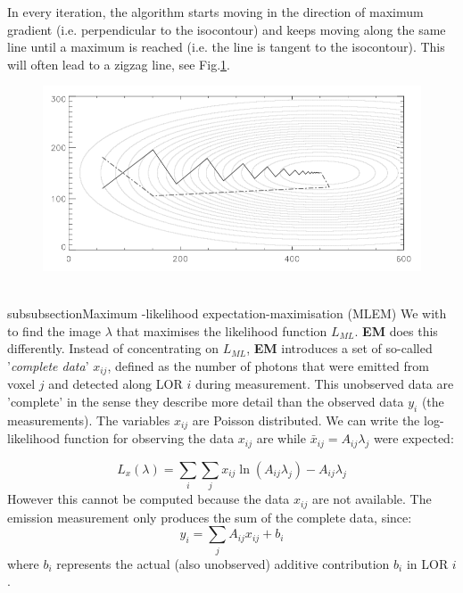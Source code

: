 \documentclass{article}
\begin{document}
In every iteration, the algorithm starts moving in the direction of maximum gradient (i.e. perpendicular to the isocontour)  and keeps moving along the same line until a maximum is reached (i.e. the line is tangent to the isocontour). This will often lead to a zigzag line, see Fig.\ref{Fig.isocontourzigzag}.
\begin{figure}
\centering
	\includegraphics[width=\linewidth]{Background Reading Analysis/IsocontourZigZag.png}
    \caption{\label{Fig.isocontourzigzag}}
\end{figure}





\\subsubsection{Maximum -likelihood expectation-maximisation (MLEM)}
We with to find the image $\lambda$ that maximises the likelihood function $L_{ML}$. \textbf{EM} does this differently. Instead of concentrating on $L_{ML}$, \textbf{EM} introduces a set of so-called '\textit{complete data}' $x_{ij}$, defined as the number of photons that were emitted from voxel $j$ and detected along LOR $i$ during measurement. This unobserved data are 'complete' in the sense they describe more detail than the observed data $y_i$ (the measurements). The variables $x_{ij}$ are Poisson distributed. We can write the log-likelihood function for observing the data $x_{ij}$ are while $\bar{x}_{ij} = A_{ij}\lambda_j$ were expected:

\begin{equation}
L_x(\lambda) = \sum_i \sum_j x_{ij} \ln (A_{ij} \lambda_j) - A_{ij}\lambda_j
\end{equation}
However this cannot be computed because the data $x_{ij}$ are not available. The emission measurement only produces the sum of the complete data, since:
\begin{equation} \label{eq.project_x}
y_i = \sum_j A_{ij} x_{ij} + b_i
\end{equation}
where $b_i$ represents the actual (also unobserved) additive contribution $b_i$ in LOR $i$.
\end{document}
